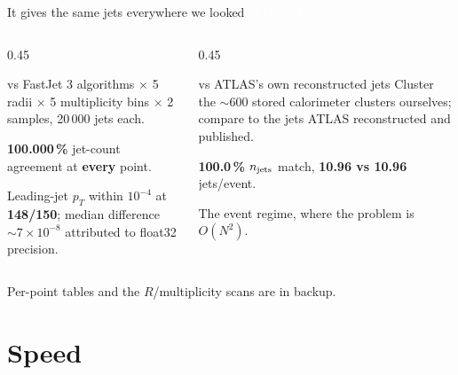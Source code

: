 \documentclass[aspectratio=169,10pt]{beamer}
\newcommand{\smallnote}[1]{{\footnotesize\color{fjgray} #1}}
\newcommand{\realC}{{\footnotesize\normalfont\textcolor{white}{[ATLAS Open Data]}}}
\begin{document}
\begin{frame}{It gives the same jets everywhere we looked \hfill \realC}
\begin{columns}[T]
\begin{column}{0.45\textwidth}
\begin{block}{vs FastJet }
\small 3 algorithms $\times$ 5 radii $\times$ 5 multiplicity bins $\times$ 2
samples, 20\,000 jets each.
\smallskip

\textbf{100.000\,\%} jet-count agreement at \textbf{every} point.
\end{block}
{\small Leading-jet $p_T$ within $10^{-4}$ at \textbf{148/150}; median
difference $\sim7\times10^{-8}$ attributed to float32 precision.}
\end{column}
\begin{column}{0.45\textwidth}
\begin{block}{vs ATLAS's own reconstructed jets}
\small Cluster the $\sim$600 stored calorimeter clusters ourselves; compare to
the jets ATLAS reconstructed and published.
\smallskip

\textbf{100.0\,\%} $n_{\rm jets}$ match, \textbf{10.96 vs 10.96} jets/event.
\end{block}
\smallnote{The event regime, where the problem is $O(N^2)$.}
\end{column}
\end{columns}
\vspace{0.3em}

\smallnote{Per-point tables and the $R$/multiplicity scans are in backup.}
\end{frame}

\section{Speed}
\end{document}
